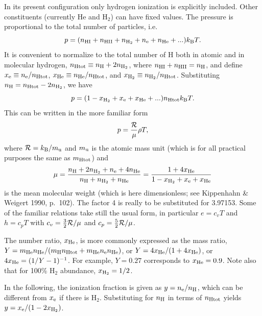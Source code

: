 \documentclass[\mydriver,12pt,twoside,notitlepage,a4paper]{article}
\begin{document}
In its present configuration only hydrogen ionization is explicitly included.
Other constituents (currently He and H$_2$) can have fixed values.
The pressure is proportional to the total number of particles, i.e.\
\begin{equation}
p=(n_{\rm HI}+n_{\rm HII}+n_{\rm H_2}+n_{\rm e}+n_{\rm He}+...)k_{\rm B}T.
\end{equation}
It is convenient to normalize to the total number of H both in atomic
and in molecular hydrogen, $n_{\rm Htot}\equiv n_{\rm H}+2n_{\rm H_2}$,
where $n_{\rm HI}+n_{\rm HII}=n_{\rm H}$, and define
$x_{\rm e}\equiv n_{\rm e}/n_{\rm Htot}$,
$x_{\rm He}\equiv n_{\rm He}/n_{\rm Htot}$, and
$x_{\rm H_2}\equiv n_{\rm H_2}/n_{\rm Htot}$.
Substituting $n_{\rm H}=n_{\rm Htot}-2n_{\rm H_2}$, we have
\begin{equation}
p=(1-x_{\rm H_2}+x_{\rm e}+x_{\rm He}+...)n_{\rm Htot}k_{\rm B}T.
\end{equation}
This can be written in the more familiar form
\begin{equation}
p={{\cal R}\over\mu}\rho T,
\end{equation}
where ${\cal R}=k_{\rm B}/m_{\rm u}$ and
$m_{\rm u}$ is the atomic mass unit (which is for all practical
purposes the same as $m_{\rm Htot}$) and
\begin{equation}
\mu={n_{\rm H}+2n_{\rm H_2}+n_{\rm e}+4n_{\rm He}\over
n_{\rm H}+n_{\rm H_2}+n_{\rm He}}
={1+4x_{\rm He}\over1-x_{\rm H_2}+x_{\rm e}+x_{\rm He}}
\end{equation}
is the mean molecular weight (which is here dimensionless; see
Kippenhahn \& Weigert 1990, p.\ 102).
The factor 4 is really to be substituted for 3.97153.
Some of the familiar relations take still the usual form, in particular
$e=c_vT$ and $h=c_pT$ with $c_v={3\over2}{\cal R}/\mu$ and
$c_p={5\over2}{\cal R}/\mu$.

The number ratio, $x_{\rm He}$, is more commonly expressed as the mass
ratio, $Y=m_{\rm He}n_{\rm He}/(m_{\rm H}n_{\rm Htot}+m_{\rm He}n_{\rm e}n_{\rm He})$,
or $Y=4x_{\rm He}/(1+4x_{\rm He})$, or $4x_{\rm He}=(1/Y-1)^{-1}$.
For example, $Y=0.27$ corresponds to $x_{\rm He}=0.9$.
Note also that for 100\% H$_2$ abundance, $x_{\rm H_2}=1/2$.

In the following, the ionization fraction is given as $y=n_{\rm e}/n_{\rm H}$,
which can be different from $x_{\rm e}$ if there is H$_2$.
Substituting for $n_{\rm H}$ in terms of $n_{\rm Htot}$ yields
$y=x_{\rm e}/(1-2x_{\rm H_2})$.

\end{document}
